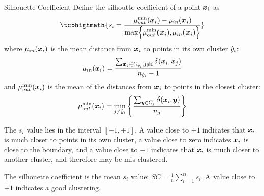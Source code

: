 \begin{frame}{Silhouette Coefficient}
  \small
Define the
silhoutte coeff\/{i}cient of a point ${\boldsymbol x}_i$ as
\begin{align*}
\tcbhighmath{
  s_i = \frac{\displaystyle \mu_{out}^{\min}(\bx_i)-\mu_{in}(\bx_i)}
  {\displaystyle \max
  \Bigl\{\mu_{out}^{\min}(\bx_i), \mu_{in}(\bx_i)\Bigr\} }
}
\end{align*}
where
$\mu_{in}({\boldsymbol x}_i)$ is the mean distance from ${\boldsymbol x}_i$ to points in its own cluster $\hat{y}_i$:
\begin{align*}
  \mu_{in}({\boldsymbol x}_i) = \frac{\sum_{{\boldsymbol x}_{j} \in C_{\hat{y}_i}, j \ne i}
  \delta({\boldsymbol x}_i,{\boldsymbol x}_{j})}{n_{\hat{y}_i}-1}
\end{align*}
and $\mu_{out}^{\min}({\boldsymbol x}_i)$ is the mean of the distances from
${\boldsymbol x}_i$ to points in the closest cluster:
\begin{align*}
  \mu_{out}^{\min}({\boldsymbol x}_i) = \min_{j\ne \hat{y}_i} \left\{
  \frac{\sum_{{\boldsymbol y} \in C_{j}} \delta({\boldsymbol x}_i,{\boldsymbol y})}{n_{j}}
  \right\}
\end{align*}

\medskip
The $s_i$ value lies in the interval $[-1, +1]$. A value
close to
$+1$ indicates that ${\boldsymbol x}_i$ is much closer to points in its own
cluster, a value close to zero indicates ${\boldsymbol x}_i$ is
close to the boundary, and a value close to $-1$
indicates that ${\boldsymbol x}_i$ is much closer to another cluster, 
and therefore
may be mis-clustered.

\medskip
The silhouette coeff\/{i}cient is the mean $s_i$ value:
  $SC = \frac{1}{n} \sum_{i=1}^n s_i$.
A value close to $+1$ indicates a good clustering.
\end{frame}


